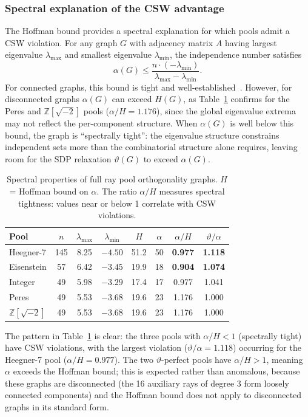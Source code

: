 \documentclass[12pt,a4paper]{article}
\newcommand{\Z}{\mathbb{Z}}
\begin{document}
\subsubsection{Spectral explanation of the CSW advantage}\label{sec:spectral}

The Hoffman bound provides a spectral explanation for which pools admit a CSW violation. For any graph $G$ with adjacency matrix $A$ having largest eigenvalue $\lambda_{\max}$ and smallest eigenvalue $\lambda_{\min}$, the independence number satisfies~\cite{Haemers1995}
\[
\alpha(G) \leq \frac{n \cdot (-\lambda_{\min})}{\lambda_{\max} - \lambda_{\min}}.
\]
For connected graphs, this bound is tight and well-established~\cite{Haemers1995}. However, for disconnected graphs $\alpha(G)$ can exceed $H(G)$, as Table~\ref{tab:spectral} confirms for the Peres and $\Z[\sqrt{-2}]$ pools ($\alpha/H = 1.176$), since the global eigenvalue extrema may not reflect the per-component structure. When $\alpha(G)$ is well below this bound, the graph is ``spectrally tight'': the eigenvalue structure constrains independent sets more than the combinatorial structure alone requires, leaving room for the SDP relaxation $\vartheta(G)$ to exceed $\alpha(G)$.

\begin{table}[ht]
\centering
\caption{Spectral properties of full ray pool orthogonality graphs. $H$ = Hoffman bound on $\alpha$. The ratio $\alpha/H$ measures spectral tightness: values near or below 1 correlate with CSW violations.}
\label{tab:spectral}
\begin{tabular}{lccccccc}
\toprule
Pool & $n$ & $\lambda_{\max}$ & $\lambda_{\min}$ & $H$ & $\alpha$ & $\alpha/H$ & $\vartheta/\alpha$ \\
\midrule
Heegner-7 & 145 & 8.25 & $-4.50$ & 51.2 & 50 & \textbf{0.977} & \textbf{1.118} \\
Eisenstein & 57 & 6.42 & $-3.45$ & 19.9 & 18 & \textbf{0.904} & \textbf{1.074} \\
Integer & 49 & 5.98 & $-3.29$ & 17.4 & 17 & 0.977 & 1.041 \\
Peres & 49 & 5.53 & $-3.68$ & 19.6 & 23 & 1.176 & 1.000 \\
$\Z[\sqrt{-2}]$ & 49 & 5.53 & $-3.68$ & 19.6 & 23 & 1.176 & 1.000 \\
\bottomrule
\end{tabular}
\end{table}

The pattern in Table~\ref{tab:spectral} is clear: the three pools with $\alpha/H < 1$ (spectrally tight) have CSW violations, with the largest violation ($\vartheta/\alpha = 1.118$) occurring for the Heegner-7 pool ($\alpha/H = 0.977$). The two $\vartheta$-perfect pools have $\alpha/H > 1$, meaning $\alpha$ exceeds the Hoffman bound; this is expected rather than anomalous, because these graphs are disconnected (the 16 auxiliary rays of degree 3 form loosely connected components) and the Hoffman bound does not apply to disconnected graphs in its standard form.
\end{document}
